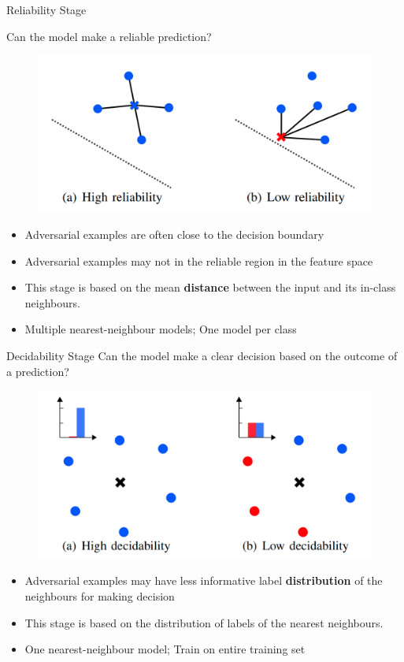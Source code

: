 \documentclass[9pt]{beamer}
\begin{document}
\begin{frame}{Reliability Stage}
\label{reliability}

Can the model make a reliable prediction?

\begin{figure}
    \centering
    \includegraphics[width=0.6\linewidth]{images/reliability.png}
\end{figure}

\begin{itemize}
    \item Adversarial examples are often close to the decision boundary
    \item Adversarial examples may not in the reliable region in the feature space
    \item This stage is based on the mean \textbf{distance} between the input and its in-class neighbours.
    \item Multiple nearest-neighbour models; One model per class
\end{itemize}

\hyperlink{decision_boundary}{}
\end{frame}

\begin{frame}{Decidability Stage}
Can the model make a clear decision based on the outcome of a prediction?

\begin{figure}
    \centering
    \includegraphics[width=0.6\linewidth]{images/decidability.png}
\end{figure}

\begin{itemize}
    \item Adversarial examples may have less informative label \textbf{distribution} of the neighbours for making decision
    \item This stage is based on the distribution of labels of the nearest neighbours.
    \item One nearest-neighbour model; Train on entire training set
\end{itemize}

\end{frame}
\end{document}
